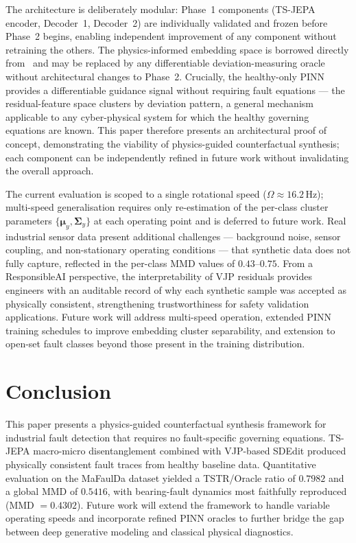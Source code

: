 \documentclass[conference]{IEEEtran}
\begin{document}
The architecture is deliberately modular: Phase~1 components (TS-JEPA encoder, Decoder~1, Decoder~2) are individually validated and frozen before Phase~2 begins, enabling independent improvement of any component without retraining the others. The physics-informed embedding space is borrowed directly from~\cite{spotorno2026linking} and may be replaced by any differentiable deviation-measuring oracle without architectural changes to Phase~2. Crucially, the healthy-only PINN provides a differentiable guidance signal without requiring fault equations --- the residual-feature space clusters by deviation pattern, a general mechanism applicable to any cyber-physical system for which the healthy governing equations are known. This paper therefore presents an architectural proof of concept, demonstrating the viability of physics-guided counterfactual synthesis; each component can be independently refined in future work without invalidating the overall approach.

The current evaluation is scoped to a single rotational speed ($\Omega \approx 16.2$\,Hz); multi-speed generalisation requires only re-estimation of the per-class cluster parameters $\{\boldsymbol{\mu}_y, \boldsymbol{\Sigma}_y\}$ at each operating point and is deferred to future work. Real industrial sensor data present additional challenges --- background noise, sensor coupling, and non-stationary operating conditions --- that synthetic data does not fully capture, reflected in the per-class MMD values of $0.43$--$0.75$. From a ResponsibleAI perspective, the interpretability of VJP residuals provides engineers with an auditable record of why each synthetic sample was accepted as physically consistent, strengthening trustworthiness for safety validation applications. Future work will address multi-speed operation, extended PINN training schedules to improve embedding cluster separability, and extension to open-set fault classes beyond those present in the training distribution.

\section{Conclusion}
\label{sec:conclusion}
This paper presents a physics-guided counterfactual synthesis framework for industrial fault detection that requires no fault-specific governing equations. TS-JEPA macro-micro disentanglement combined with VJP-based SDEdit produced physically consistent fault traces from healthy baseline data. Quantitative evaluation on the MaFaulDa dataset yielded a TSTR/Oracle ratio of $0.7982$ and a global MMD of $0.5416$, with bearing-fault dynamics most faithfully reproduced (MMD $=0.4302$). Future work will extend the framework to handle variable operating speeds and incorporate refined PINN oracles to further bridge the gap between deep generative modeling and classical physical diagnostics.



\end{document}
